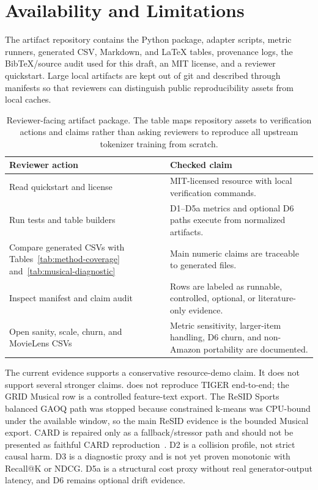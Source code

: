\section{Availability and Limitations}

The artifact repository contains the \tool Python package, adapter scripts,
metric runners, generated CSV, Markdown, and \LaTeX{} tables, provenance logs,
the BibTeX/source audit used for this draft, an MIT license, and a reviewer
quickstart. Large local artifacts are kept out of git and described through
manifests so that reviewers can distinguish public reproducibility assets from
local caches.

\begin{table}[t]
\caption{Reviewer-facing artifact package. The table maps repository assets to
verification actions and claims rather than asking reviewers to reproduce all
upstream tokenizer training from scratch.}
\label{tab:artifact-package}
\small
\setlength{\tabcolsep}{3pt}
\begin{tabularx}{\columnwidth}{@{}p{}Y@{}}
\toprule
Reviewer action & Checked claim \\
\midrule
Read quickstart and license & MIT-licensed resource with local verification
commands. \\
Run tests and table builders & D1--D5a metrics and optional D6 paths execute
from normalized artifacts. \\
Compare generated CSVs with Tables~\ref{tab:method-coverage}
and~\ref{tab:musical-diagnostic} & Main numeric claims are traceable to
generated files. \\
Inspect manifest and claim audit & Rows are labeled as runnable, controlled,
optional, or literature-only evidence. \\
Open sanity, scale, churn, and MovieLens CSVs & Metric sensitivity, larger-item
handling, D6 churn, and non-Amazon portability are documented. \\
\bottomrule
\end{tabularx}
\end{table}

The current evidence supports a conservative resource-demo claim. It does not
support several stronger claims. \tool does not reproduce TIGER end-to-end; the
GRID Musical row is a controlled feature-text export. The ReSID Sports balanced
GAOQ path was stopped because constrained k-means was CPU-bound under the
available window, so the main ReSID evidence is the bounded Musical export.
CARD is repaired only as a fallback/stressor path and should not be presented
as faithful CARD reproduction~\cite{wei2026card}. D2 is a collision profile,
not strict causal harm. D3 is a diagnostic proxy and is not yet proven
monotonic with Recall@K or NDCG. D5a is a structural cost proxy without real
generator-output latency, and D6 remains optional drift evidence.

